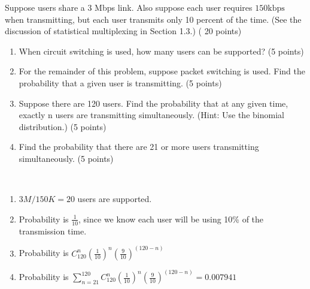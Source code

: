 \begin{exercise}[]{Suppose users share a 3 Mbps link. Also suppose each user requires $150 \mathrm{kbps}$ when transmitting, but each user transmits only 10 percent of the time. (See the discussion of statistical multiplexing in Section 1.3.) ( 20 points)
    \begin{enumerate}
        \item When circuit switching is used, how many users can be supported? (5 points)
        \item For the remainder of this problem, suppose packet switching is used. Find the probability that a given user is transmitting. (5 points)
        \item Suppose there are 120 users. Find the probability that at any given time, exactly n users are transmitting simultaneously. (Hint: Use the binomial distribution.) (5 points)
        \item Find the probability that there are 21 or more users transmitting simultaneously. (5 points)
    \end{enumerate}
    }
  \begin{solution}
  \par{~}
  \begin{enumerate}
    \item $3M/150K = 20$ users are supported.
    \item Probability is $\frac{1}{10}$, since we know each user will be using 10\% of the transmission time.
    \item Probability is $C_{120}^{n} \left(\frac{1}{10}\right)^n \left(\frac{9}{10}\right)^{(120-n)}$
    \item Probability is $\sum_{n=21}^{120}C_{120}^{n} \left(\frac{1}{10}\right)^n \left(\frac{9}{10}\right)^{(120-n)} = 0.007941$
  \end{enumerate}
  \end{solution}
  \label{ex2}
\end{exercise}

